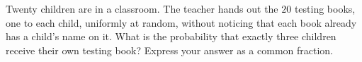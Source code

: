 Twenty children are in a classroom. The teacher hands out the $20$ testing books, one to each child, uniformly at random, without noticing that each book already has a child's name on it. What is the probability that exactly three children receive their own testing book? Express your answer as a common fraction.
